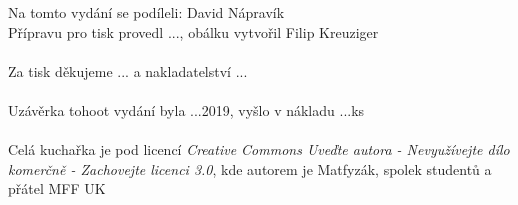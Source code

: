 \tableofcontents
\vspace*{\fill}
Na tomto vydání se podíleli: David Nápravík \\
Přípravu pro tisk provedl ..., obálku vytvořil Filip Kreuziger\\
\\
Za tisk děkujeme ... a nakladatelství ... \\
\\
Uzávěrka tohoot vydání byla ...2019, vyšlo v nákladu ...ks \\
\\
Celá kuchařka je pod licencí \textit{Creative Commons Uveďte autora - Nevyužívejte dílo komerčně - Zachovejte licenci 3.0}, kde autorem je Matfyzák, spolek studentů a přátel MFF UK

\newpage